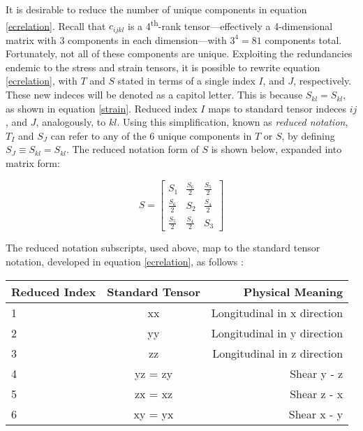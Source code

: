 \documentclass[a4paper,10pt]{report}
\numberwithin{equation}{section}
\begin{document}
It is desirable to reduce the number of unique components in equation
\eqref{ecrelation}. Recall that $c_{ijkl}$ is a 4\textsuperscript{th}-rank
tensor---effectively a 4-dimensional matrix with 3 components in each dimension---with $3^4 = 81$ components total. Fortunately, not all of these components are unique. Exploiting the redundancies endemic to the stress and strain tensors, it is
possible to rewrite equation \eqref{ecrelation}, with $T$ and $S$ stated in terms 
of a single index $I$, and $J$, respectively. These new indeces will be denoted as a capitol letter. This is because $S_{kl} =
S_{kl}$, as shown in equation \eqref{strain}. Reduced index $I$ maps to standard tensor indeces $ij$, and $J$, analogously, to $kl$. 
Using this simplification, known as \emph{reduced notation}, $T_I$ and $S_J$ can refer
to any of the 6 unique components in $T$ or $S$, by defining $S_{J} \equiv
S_{kl} = S_{kl}$. The reduced notation form of $S$ is shown below, expanded into matrix form\cite[p.~542]{Kino1987}:
\begin{singlespace}
\begin{equation}
 S = \begin{bmatrix}
      S_{1} & \frac{S_{6}}{2} & \frac{S_{5}}{2} \\[0.5em]
      \frac{S_{6}}{2} & S_{2} & \frac{S_{4}}{2} \\[0.5em]
      \frac{S_{5}}{2} & \frac{S_{4}}{2} & S_{3}
     \end{bmatrix}
\end{equation}
\end{singlespace}
The reduced notation subscripts, used above, map to the standard tensor notation, developed in equation \eqref{ecrelation}, as follows\cite[p.~17]{Ballantine1997} \cite[p.~543]{Kino1987}:
\begin{singlespace}
\begin{tabular}{l | c | r}
\hline
Reduced Index & Standard Tensor & Physical Meaning\\
\hline
1 & xx & Longitudinal in x direction\\
2 & yy & Longitudinal in y direction\\
3 & zz & Longitudinal in z direction\\
4 & yz = zy & Shear y - z\\
5 & zx = xz & Shear z - x\\
6 & xy = yx & Shear x - y
\label{tab:tensor}
\end{tabular}
{}\\
{}\\
\end{singlespace}
\end{document}
